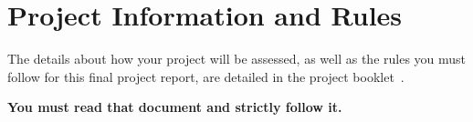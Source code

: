 \documentclass[]{final_report}
\begin{document}
\chapter{Project Information and Rules}

The details about how your project will be assessed, as well as the rules you must follow for this final project report, are detailed in the project booklet~.

\textbf{You must read that document and strictly follow it.}


\newpage



\label{endpage}
\end{document}
